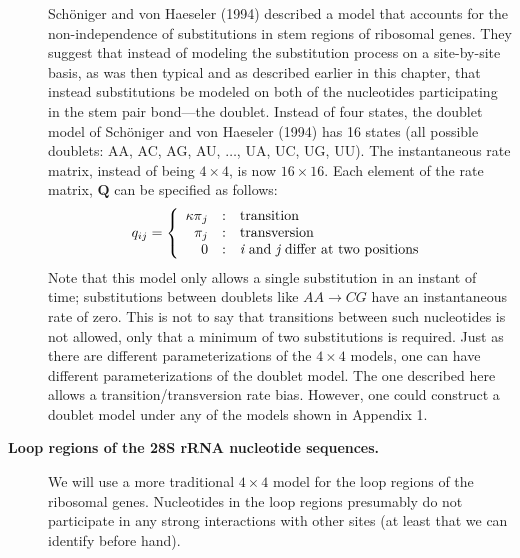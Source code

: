 \documentclass{svmult}
\begin{document}
\begin{description}
Sch\"oniger and von Haeseler (1994) described a model that accounts for the non-independence of substitutions in stem regions of ribosomal genes. They
suggest that instead of modeling the substitution process on a site-by-site basis, as was then typical and as described earlier in this chapter, that instead substitutions
be modeled on both of the nucleotides participating in the stem pair bond---the doublet.  Instead of four states, the doublet model of Sch\"oniger and  von Haeseler (1994) has
16 states (all possible doublets: AA, AC, AG, AU, $\ldots$, UA, UC, UG, UU). The instantaneous rate matrix, instead of being $4 \times 4$, is now $16 \times 16$. Each element
of the rate matrix, ${\mathbf Q}$ can be specified as follows:
$$
q_{ij} = \left\{
   \begin{array}{r@{\quad:\quad}l}
      {\kappa \pi}_j & \mbox{transition}                                  \\
      {       \pi}_j & \mbox{transversion}                                \\
      0             & \mbox{{\it i} and {\it j} differ at two positions} \\
   \end{array}
\right.
$$
Note that this model only allows a single substitution in an instant of time; substitutions between doublets like $AA \rightarrow CG$ have an instantaneous rate of zero.
This is not to say that transitions between such nucleotides is not allowed, only that a minimum of two substitutions is required. Just as there are different parameterizations
of the $4 \times 4$ models, one can have different parameterizations of the doublet model. The one described here allows a transition/transversion rate bias. However,
one could construct a doublet model under any of the models shown in Appendix 1. \\

\item[ {\bf Loop regions of the 28S rRNA nucleotide sequences.}] We will use a more traditional $4 \times 4$ model for the loop regions of the ribosomal genes. Nucleotides
in the loop regions presumably do not participate in any strong interactions with other sites (at least that we can identify before hand). \\


\end{description}
\end{document}
